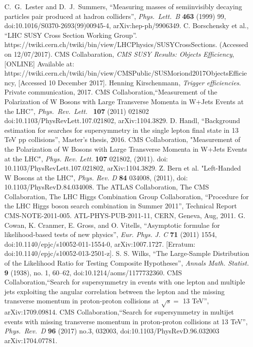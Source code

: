 \begin{thebibliography}{9}
C.~G.~Lester and D.~J.~Summers, ``Measuring masses of semiinvisibly decaying particles pair produced at hadron colliders'', {\it Phys.\ Lett.\ B} {\bf 463} (1999) 99, doi:10.1016/S0370-2693(99)00945-4, arXiv:hep-ph/9906349.
C. Borschensky et al., “LHC SUSY Cross Section Working Group”. https://twiki.cern.ch/twiki/bin/view/LHCPhysics/SUSYCrossSections. (Accessed on 12/07/2017).
CMS Collabaration, {\it CMS SUSY Results: Objects Efficiency}, [ONLINE] Available at: https://twiki.cern.ch/twiki/bin/view/CMSPublic/SUSMoriond2017ObjectsEfficiency, [Accessed 10 December 2017].
Henning Kirschenmann, {\it Trigger efficiencies}. Private communication, 2017.
CMS Collaboration,``Measurement of the Polarization of W Bosons with Large Transverse Momenta in W+Jets Events at the LHC'', {\it Phys.\ Rev.\ Lett.\ } {\bf 107} (2011) 021802
  doi:10.1103/PhysRevLett.107.021802, arXiv:1104.3829.
D. Handl, “Background estimation for searches for supersymmetry in the single lepton final state in 13 TeV pp collisions”, Master’s thesis, 2016.
CMS Collaboration, "Measurement of the Polarization of W Bosons with Large Transverse Momenta in W+Jets Events at the LHC", {\it Phys. Rev. Lett.} {\bf 107} 021802, (2011). 
doi: 10.1103/PhysRevLett.107.021802,
arXiv:1104.3829.
Z. Bern et al. "Left-Handed W Bosons at the LHC", {\it Phys. Rev. D} {\bf 84} 034008, (2011), doi: 10.1103/PhysRevD.84.034008.
The ATLAS Collaboration, The CMS Collaboration, The LHC Higgs Combination Group Collaboration, “Procedure for the LHC Higgs boson search combination in Summer 2011”, Technical Report CMS-NOTE-2011-005. ATL-PHYS-PUB-2011-11, CERN, Geneva, Aug, 2011.
G. Cowan, K. Cranmer, E. Gross, and O. Vitells, “Asymptotic formulae for likelihood-based tests of new physics”, {\it Eur. Phys. J. C} {\bf 71} (2011) 1554, doi:10.1140/epjc/s10052-011-1554-0, arXiv:1007.1727. [Erratum: doi:10.1140/epjc/s10052-013-2501-z].
S. S. Wilks, “The Large-Sample Distribution of the Likelihood Ratio for Testing Composite Hypotheses”, {\it Annals Math. Statist.} {\bf 9} (1938), no. 1, 60–62, doi:10.1214/aoms/1177732360.
CMS Collaboration,``Search for supersymmetry in events with one lepton and multiple jets exploiting the angular correlation between the lepton and the missing transverse momentum in proton-proton collisions at $\sqrt{s} = $ 13 TeV'', arXiv:1709.09814.
CMS Collaboration,``Search for supersymmetry in multijet events with missing transverse momentum in proton-proton collisions at 13 TeV'',
{\it Phys.\ Rev.\ D} {\bf 96} (2017) no.3,  032003, doi:10.1103/PhysRevD.96.032003
arXiv:1704.07781.



\end{thebibliography}
